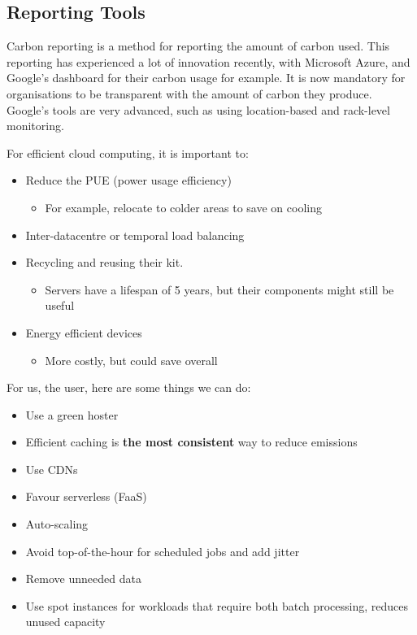 \documentclass[11pt,a4paper,titlepage,dvipsnames,cmyk]{scrartcl}
\begin{document}
\subsection{Reporting Tools}
Carbon reporting is a method for reporting the amount of carbon used. This reporting has experienced a lot of innovation recently, with Microsoft Azure, and Google's dashboard for their carbon usage for example. It is now mandatory for organisations to be transparent with the amount of carbon they produce. Google's tools are very advanced, such as using location-based and rack-level monitoring.

For efficient cloud computing, it is important to:
\begin{itemize}
    \item Reduce the PUE (power usage efficiency)
    \begin{itemize}
        \item For example, relocate to colder areas to save on cooling
    \end{itemize}
    \item Inter-datacentre or temporal load balancing
    \item Recycling and reusing their kit.
    \begin{itemize}
        \item Servers have a lifespan of 5 years, but their components might still be useful
    \end{itemize}
    \item Energy efficient devices
    \begin{itemize}
        \item More costly, but could save overall
    \end{itemize}
\end{itemize}

For us, the user, here are some things we can do:
\begin{itemize}
    \item Use a green hoster
    \item Efficient caching is \textbf{the most consistent} way to reduce emissions
    \item Use CDNs
    \item Favour serverless (FaaS)
    \item Auto-scaling
    \item Avoid top-of-the-hour for scheduled jobs and add jitter
    \item Remove unneeded data
    \item Use spot instances for workloads that require both batch processing, reduces unused capacity
\end{itemize}
\end{document}
